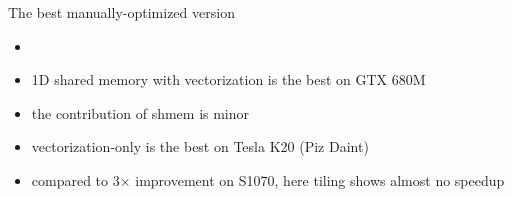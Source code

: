 \documentclass[aspectratio=169]{beamer}
\begin{document}
\begin{frame}[fragile,t]{The best manually-optimized version}

\begin{minipage}[t][2.5cm]{\textwidth}
\begin{itemize}
\item[]
\item 1D shared memory with vectorization is the best on GTX 680M
\item the contribution of shmem is minor
\item vectorization-only is the best on Tesla K20 (Piz Daint)
\item compared to {3$\times$} improvement on S1070, here tiling shows almost no speedup
\end{itemize}
\end{minipage}

%
\end{frame}
\end{document}
